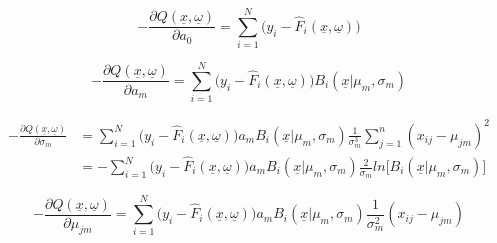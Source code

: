 \documentclass[11pt]{article}
\begin{document}
 \begin{equation}
 - \frac{\partial Q(\underline{x}, \underline{\omega})}{\partial a_0} = \sum_{i =1}^N \Big(y_i - \hat{F}_i(\underline{x}, \underline{\omega}) \Big)
 \end{equation}
 
 \begin{equation}
 - \frac{\partial Q(\underline{x}, \underline{\omega})}{\partial a_m} = \sum_{i =1}^N \Big(y_i - \hat{F}_i(\underline{x}, \underline{\omega}) \Big)B_i(\underline{x}|\mu_m, \sigma_m) 
 \end{equation}
 

\begin{equation}
\begin{split}
 - \frac{\partial Q(\underline{x}, \underline{\omega})}{\partial \sigma_m} & = \sum_{i=1}^N \Big(y_i - \hat{F}_i(\underline{x}, \underline{\omega}) \Big) a_m B_i(\underline{x}|\mu_m, \sigma_m) \frac{1}{\sigma_m^3} \sum_{j = 1}^{n}(x_{ij} - \mu_{jm})^2\\ & = - \sum_{i=1}^N \Big(y_i - \hat{F}_i(\underline{x}, \underline{\omega}) \Big) a_m B_i(\underline{x}|\mu_m, \sigma_m) \frac{2}{\sigma_m} ln \bigg[B_i(\underline{x}|\mu_m, \sigma_m) \bigg]
 \end{split}
 \end{equation}
 
 \begin{equation}
 - \frac{\partial Q(\underline{x}, \underline{\omega})}{\partial \mu_{jm}} = \sum_{i=1}^N\Big(y_i - \hat{F}_i(\underline{x}, \underline{\omega}) \Big) a_m B_i(\underline{x}|\mu_m, \sigma_m) \frac{1}{\sigma_m^2}(x_{ij} - \mu_{jm})
 \end{equation}


\vspace{5 mm}
\noindent
\end{document}
